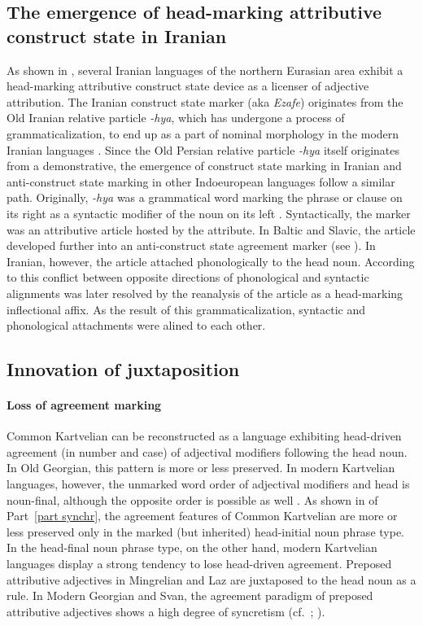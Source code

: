 {\subsection[Head-marking attributive construct state]{The emergence of head-marking attributive construct state in Iranian}\label{iranian diachr}
As shown in , several Iranian languages of the northern Eurasian area exhibit a head-marking attributive construct state device as a licenser of adjective attribution. The Iranian construct state marker (aka \textit{Ezafe}) originates from the Old Iranian relative particle \textit{-hya}, which has undergone a process of grammaticalization, to end up as a part of nominal morphology in the modern Iranian languages \citep{haider-etal1984,samvelian2007b}. Since the Old Persian relative particle \textit{-hya} itself originates from a demonstrative, the emergence of construct state marking in Iranian and anti-construct state marking in other Indoeuropean languages follow a similar path. Originally, \textit{-hya} was a grammatical word marking the phrase or clause on its right as a syntactic modifier of the noun on its left \citep{haider-etal1984}. Syntactically, the marker was an attributive article hosted by the attribute. In Baltic and Slavic, the article developed further into an anti-construct state agreement marker (see ). In Iranian, however, the article attached phonologically to the head noun. According to \citet[3]{samvelian2007} this conflict between opposite directions of phonological and syntactic alignments was later resolved by the reanalysis of the article as a head-marking inflectional affix. As the result of this grammaticalization, syntactic and phonological attachments were alined to each other.

\subsection[Innovation of juxtaposition]{Innovation of juxtaposition}
\paragraph{Loss of agreement marking}
Common Kartvelian can be reconstructed as a language exhibiting head-driven agreement (in number and case) of adjectival modifiers following the head noun. In Old Georgian, this pattern is more or less preserved. In modern Kartvelian languages, however, the unmarked word order of adjectival modifiers and head is noun-final, although the opposite order is possible as well \cite[56]{harris1991a}. As shown in  of Part~\ref{part synchr}, the agreement features of Common Kartvelian are more or less preserved only in the marked (but inherited) head-initial noun phrase type. In the head-final noun phrase type, on the other hand, modern Kartvelian languages display a strong tendency to lose head-driven agreement. Preposed attributive adjectives in Mingrelian and Laz are juxtaposed to the head noun as a rule. In Modern Georgian and Svan, the agreement paradigm of preposed attributive adjectives shows a high degree of syncretism (cf.~\citealt[56]{harris1991a}; \citealt[56–60, elsewhere]{tuite1998}).

}
